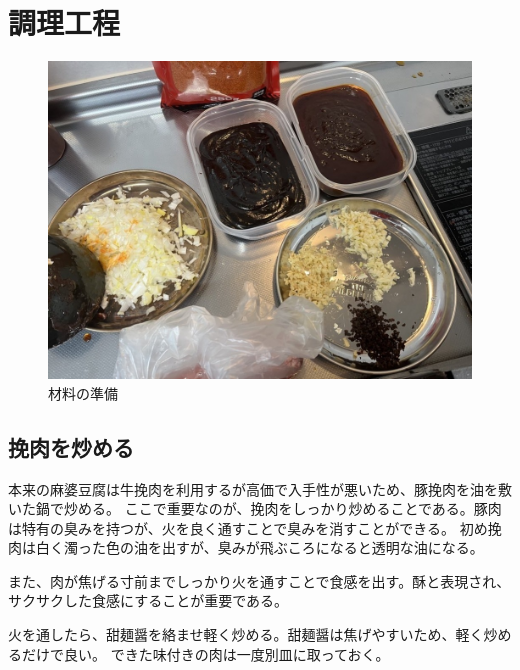 \documentclass[a4paper,10pt,xelatex,ja=standard,twocolumn]{bxjsarticle}
\begin{document}
\section{調理工程}

\begin{figure}[h]
  \caption{材料の準備}
  \label{ziaryo}
  \begin{center}
    \includegraphics[width=\linewidth]{IMG_4080.jpg}
  \end{center}
\end{figure}

\subsection{挽肉を炒める}

本来の麻婆豆腐は牛挽肉を利用するが高価で入手性が悪いため、豚挽肉を油を敷いた鍋で炒める。
ここで重要なのが、挽肉をしっかり炒めることである。豚肉は特有の臭みを持つが、火を良く通すことで臭みを消すことができる。
初め挽肉は白く濁った色の油を出すが、臭みが飛ぶころになると透明な油になる。

また、肉が焦げる寸前までしっかり火を通すことで食感を出す。酥と表現され、サクサクした食感にすることが重要である。

火を通したら、甜麺醤を絡ませ軽く炒める。甜麺醤は焦げやすいため、軽く炒めるだけで良い。
できた味付きの肉は一度別皿に取っておく。
\end{document}

